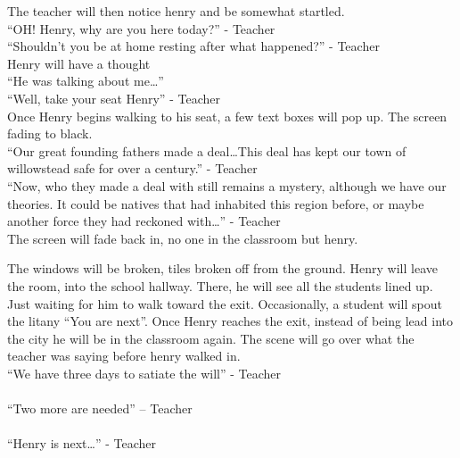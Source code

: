 \documentclass[12pt, a4paper, titlepage]{article}
\begin{document}
            The teacher will then notice henry and be somewhat startled.\\
            
            ``OH! Henry, why are you here today?'' - Teacher\\
            
            ``Shouldn't you be at home resting after what happened?'' - Teacher\\
            
            Henry will have a thought\\
            
            ``He was talking about me\ldots''\\
            
            ``Well, take your seat Henry'' - Teacher\\
            
            Once Henry begins walking to his seat, a few text boxes will pop up. The screen fading to black.\\
            
            ``Our great founding fathers made a deal\ldots This deal has kept our town of willowstead safe for over a century.'' - Teacher\\
            
            ``Now, who they made a deal with still remains a mystery, although we have our theories. It could be natives that had inhabited this region before, or maybe another force they had reckoned with\ldots'' - Teacher\\
            
            The screen will fade back in, no one in the classroom but henry. 
            
            The windows will be broken, tiles broken off from the ground. Henry will leave the room, into the school hallway. There, he will see all the students lined up. Just
            waiting for him to walk toward the exit. Occasionally, a student will spout the litany ``You are next''. Once Henry reaches the exit, instead of being lead into the city
            he will be in the classroom again. The scene will go over what the teacher was saying before henry walked in.\\
            
           ``We have three days to satiate the will'' - Teacher\\~\\
           ``Two more are needed'' -- Teacher\\~\\
           ``Henry is next\ldots'' - Teacher\\~\\
           
\end{document}
